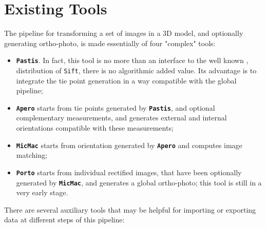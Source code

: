 \section{Existing Tools}


\label{Gen:ExTools}

The pipeline for transforming a set of images in a 3D model, and optionally
generating ortho-photo, is made essentially of four
"complex" tools:


\begin{itemize}
   \item {\tt \bf Pastis}. In fact, this tool is no more than an interface to the
         well known \SiftPP, distribution of {\tt Sift}, there is no algorithmic
         added value. Its advantage is to integrate the tie point generation
         in a way compatible with the global pipeline;

   \item {\tt \bf Apero} starts from tie points generated by {\tt \bf Pastis},
         and optional complementary measurements, and generates external and internal
         orientations compatible with these measurements;

   \item {\tt \bf MicMac} starts from orientation generated by {\tt \bf Apero} and
         computes image matching;


   \item {\tt \bf Porto}  starts from individual rectified images, that have been
         optionally generated by  {\tt \bf MicMac}, and generates a global ortho-photo;
         this tool is still in a very early stage.
\end{itemize}

There are several auxiliary tools that may be helpful for importing or
exporting data at different steps of this pipeline:



